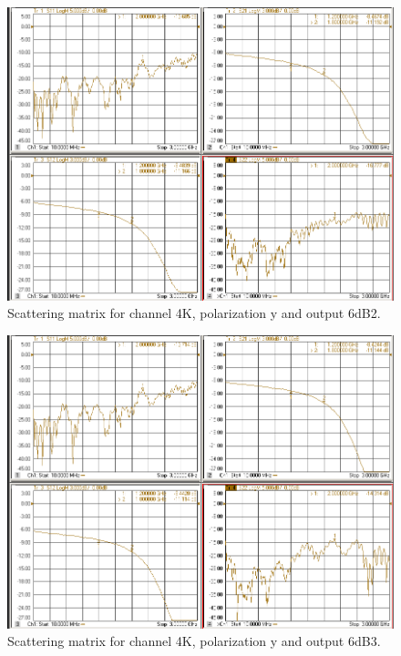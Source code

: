 \documentclass[12pt,a4paper,oneside]{article}
\begin{document}
\begin{figure}[H]
\centering
\includegraphics[width=0.9\linewidth]{VNA_results/4Ky_6dB2.png}
\caption{Scattering matrix for channel 4K, polarization y and output 6dB2.}
\label{fig:4Ky_6dB2}
\end{figure}


\begin{figure}[H]
\centering
\includegraphics[width=0.9\linewidth]{VNA_results/4Ky_6dB3.png}
\caption{Scattering matrix for channel 4K, polarization y and output 6dB3.}
\label{fig:4Ky_6dB3}
\end{figure}
\end{document}
